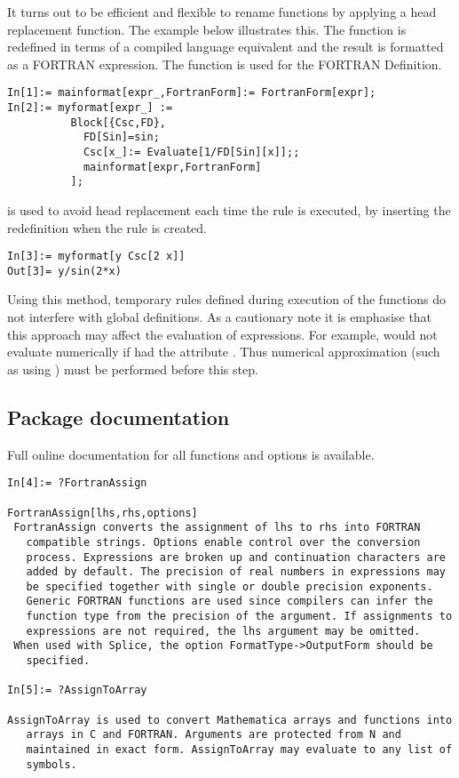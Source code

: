 \documentclass [12pt,twoside]{article}
\begin{document}
It turns out to be efficient and flexible to rename functions by applying
a head replacement function. The example below illustrates this.
The function  is redefined in terms of a compiled language equivalent
and the result is formatted as a FORTRAN expression. The function  is
used for the FORTRAN Definition. 
\begin{verbatim}
In[1]:= mainformat[expr_,FortranForm]:= FortranForm[expr];
In[2]:= myformat[expr_] :=
          Block[{Csc,FD},
            FD[Sin]=sin;
            Csc[x_]:= Evaluate[1/FD[Sin][x]];;
            mainformat[expr,FortranForm]
          ];
\end{verbatim}
 is used to avoid head replacement each time the rule is executed,
by inserting the redefinition when the rule is created.
\begin{verbatim}
In[3]:= myformat[y Csc[2 x]]
Out[3]= y/sin(2*x)
\end{verbatim}
Using this method, temporary rules defined during execution of the 
functions do not interfere with global definitions. As a cautionary note it is
emphasise that this approach may affect the evaluation of expressions. For example,
 would not evaluate numerically if  had the attribute
. Thus numerical approximation (such as using ) must be
performed before this step.

\pagebreak[2]

\subsection{Package documentation}
Full online documentation for all functions and options is available.

\begin{verbatim}
In[4]:= ?FortranAssign

FortranAssign[lhs,rhs,options]
 FortranAssign converts the assignment of lhs to rhs into FORTRAN
   compatible strings. Options enable control over the conversion
   process. Expressions are broken up and continuation characters are
   added by default. The precision of real numbers in expressions may
   be specified together with single or double precision exponents.
   Generic FORTRAN functions are used since compilers can infer the
   function type from the precision of the argument. If assignments to
   expressions are not required, the lhs argument may be omitted.
 When used with Splice, the option FormatType->OutputForm should be
   specified.

In[5]:= ?AssignToArray

AssignToArray is used to convert Mathematica arrays and functions into
   arrays in C and FORTRAN. Arguments are protected from N and
   maintained in exact form. AssignToArray may evaluate to any list of
   symbols.
\end{verbatim}
\end{document}
